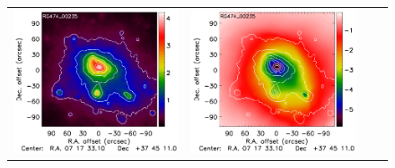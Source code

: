 \documentclass[twocolumn,traditabstract]{aa}
\begin{document}
\begin{figure}[h]
{\begin{tabular}{llll}
\includegraphics[trim=0cm 0.7cm 0.0cm 0cm, clip=true, scale=1]{Figure/Map_RG474_00235_DMmap_zproj_zobs0p4_raw.pdf} & 
\includegraphics[trim=2.3cm 0.7cm 0.0cm 0cm, clip=true, scale=1]{Figure/Map_RG474_00235_Ymap_zobs0p4_raw.pdf} & 

\end{tabular}}
\end{figure}
\end{document}
